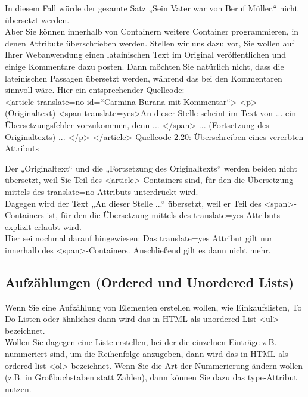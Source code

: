 In diesem Fall würde der gesamte Satz „Sein Vater war von Beruf Müller.“ nicht übersetzt werden.\\

Aber Sie können innerhalb von Containern weitere Container programmieren, in denen Attribute überschrieben werden. Stellen wir uns dazu vor, Sie wollen auf Ihrer Webanwendung einen latainischen Text im Original veröffentlichen und einige Kommentare dazu posten. Dann möchten Sie natürlich nicht, dass die lateinischen Passagen übersetzt werden, während das bei den Kommentaren sinnvoll wäre. Hier ein entsprechender Quellcode:\\

<article translate=no id=“Carmina Burana mit Kommentar“>
<p> (Originaltext) <span translate=yes>An dieser Stelle scheint im Text von ... ein Übersetzungsfehler vorzukommen, denn ... </span> ... (Fortsetzung des Originaltexts) ... </p>
</article>
Quellcode 2.20: Überschreiben eines vererbten Attributs

Der „Originaltext“ und die „Fortsetzung des Originaltexts“ werden beiden nicht übersetzt, weil Sie Teil des <article>-Containers sind, für den die Übersetzung mittels des translate=no Attributs unterdrückt wird.\\

Dagegen wird der Text „An dieser Stelle ...“ übersetzt, weil er Teil des <span>-Containers ist, für den die Übersetzung mittels des translate=yes Attributs explizit erlaubt wird.\\

Hier sei nochmal darauf hingewiesen: Das translate=yes Attribut gilt nur innerhalb des <span>-Containers. Anschließend gilt es dann nicht mehr. 

\subsection{Aufzählungen (Ordered und Unordered Lists)}

Wenn Sie eine Aufzählung von Elementen erstellen wollen, wie Einkaufslisten, To Do Listen oder ähnliches dann wird das in HTML als unordered List <ul> bezeichnet. \\

Wollen Sie dagegen eine Liste erstellen, bei der die einzelnen Einträge z.B. nummeriert sind, um die Reihenfolge anzugeben, dann wird das in HTML als ordered list <ol> bezeichnet. Wenn Sie die Art der Nummerierung ändern wollen (z.B. in Großbuchstaben statt Zahlen), dann können Sie dazu das type-Attribut nutzen.\\

